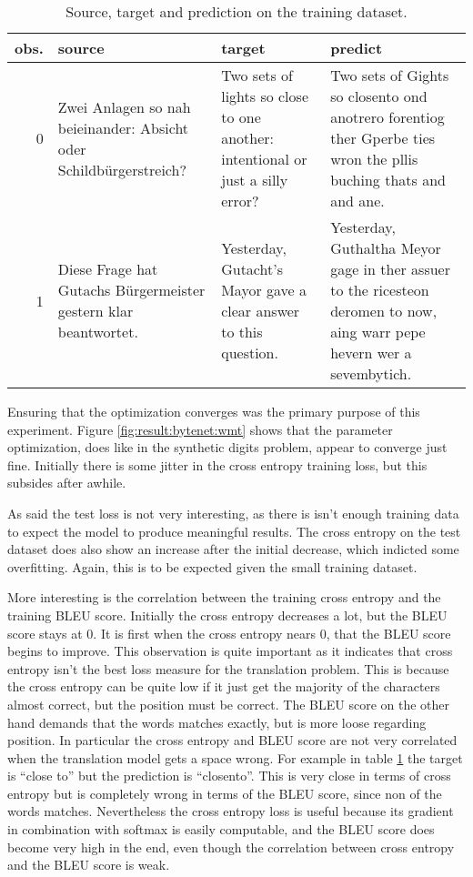 \begin{table}[h]
\centering
\begin{tabular}{r|p{3.3cm} p{3.3cm} p{3.3cm}}
	obs. & source & target & predict\\ \hline
  0  & Zwei Anlagen so nah beieinander: Absicht oder Schildbürgerstreich? & Two sets of lights so close to one another: intentional or just a silly error? & Two sets of Gights so closento ond anotrero forentiog ther Gperbe ties wron the pllis buching thats and and ane. \\
  1 & Diese Frage hat Gutachs Bürgermeister gestern klar beantwortet. & Yesterday, Gutacht's Mayor gave a clear answer to this question. & Yesterday, Guthaltha Meyor gage in ther assuer to the ricesteon deromen to now, aing warr pepe hevern wer a sevembytich.
\end{tabular}
\caption{Source, target and prediction on the training dataset.}
\label{table:result:bytenet:wmt-train}
\end{table}

Ensuring that the optimization converges was the primary purpose of this experiment. Figure \ref{fig:result:bytenet:wmt} shows that the parameter optimization, does like in the synthetic digits problem, appear to converge just fine. Initially there is some jitter in the cross entropy training loss, but this subsides after awhile. 

As said the test loss is not very interesting, as there is isn't enough training data to expect the model to produce meaningful results. The cross entropy on the test dataset does also show an increase after the initial decrease, which indicted some overfitting. Again, this is to be expected given the small training dataset.

More interesting is the correlation between the training cross entropy and the training BLEU score. Initially the cross entropy decreases a lot, but the BLEU score stays at 0. It is first when the cross entropy nears 0, that the BLEU score begins to improve. This observation is quite important as it indicates that cross entropy isn't the best loss measure for the translation problem. This is because the cross entropy can be quite low if it just get the majority of the characters almost correct, but the position must be correct. The BLEU score on the other hand demands that the words matches exactly, but is more loose regarding position. In particular the cross entropy and BLEU score are not very correlated when the translation model gets a space wrong. For example in table \ref{table:result:bytenet:wmt-train} the target is ``close to'' but the prediction is ``closento''. This is very close in terms of cross entropy but is completely wrong in terms of the BLEU score, since non of the words matches. Nevertheless the cross entropy loss is useful because its gradient in combination with softmax is easily computable, and the BLEU score does become very high in the end, even though the correlation between cross entropy and the BLEU score is weak.

